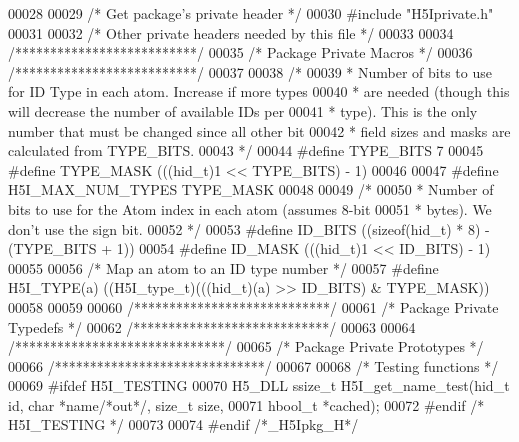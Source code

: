 \begin{DoxyCode}
00028 
00029 \textcolor{comment}{/* Get package's private header */}
00030 \textcolor{preprocessor}{#include "H5Iprivate.h"}
00031 
00032 \textcolor{comment}{/* Other private headers needed by this file */}
00033 
00034 \textcolor{comment}{/**************************/}
00035 \textcolor{comment}{/* Package Private Macros */}
00036 \textcolor{comment}{/**************************/}
00037 
00038 \textcolor{comment}{/*}
00039 \textcolor{comment}{ * Number of bits to use for ID Type in each atom. Increase if more types}
00040 \textcolor{comment}{ * are needed (though this will decrease the number of available IDs per}
00041 \textcolor{comment}{ * type). This is the only number that must be changed since all other bit}
00042 \textcolor{comment}{ * field sizes and masks are calculated from TYPE\_BITS.}
00043 \textcolor{comment}{ */}
00044 \textcolor{preprocessor}{#define TYPE\_BITS   7}
00045 \textcolor{preprocessor}{#define TYPE\_MASK   (((hid\_t)1 << TYPE\_BITS) - 1)}
00046 
00047 \textcolor{preprocessor}{#define H5I\_MAX\_NUM\_TYPES TYPE\_MASK}
00048 
00049 \textcolor{comment}{/*}
00050 \textcolor{comment}{ * Number of bits to use for the Atom index in each atom (assumes 8-bit}
00051 \textcolor{comment}{ * bytes). We don't use the sign bit.}
00052 \textcolor{comment}{ */}
00053 \textcolor{preprocessor}{#define ID\_BITS     ((sizeof(hid\_t) * 8) - (TYPE\_BITS + 1))}
00054 \textcolor{preprocessor}{#define ID\_MASK     (((hid\_t)1 << ID\_BITS) - 1)}
00055 
00056 \textcolor{comment}{/* Map an atom to an ID type number */}
00057 \textcolor{preprocessor}{#define H5I\_TYPE(a) ((H5I\_type\_t)(((hid\_t)(a) >> ID\_BITS) & TYPE\_MASK))}
00058 
00059 
00060 \textcolor{comment}{/****************************/}
00061 \textcolor{comment}{/* Package Private Typedefs */}
00062 \textcolor{comment}{/****************************/}
00063 
00064 \textcolor{comment}{/******************************/}
00065 \textcolor{comment}{/* Package Private Prototypes */}
00066 \textcolor{comment}{/******************************/}
00067 
00068 \textcolor{comment}{/* Testing functions */}
00069 \textcolor{preprocessor}{#ifdef H5I\_TESTING}
00070 H5\_DLL ssize\_t H5I\_get\_name\_test(hid\_t \textcolor{keywordtype}{id}, \textcolor{keywordtype}{char} *name\textcolor{comment}{/*out*/}, \textcolor{keywordtype}{size\_t} size,
00071     hbool\_t *cached);
00072 \textcolor{preprocessor}{#endif }\textcolor{comment}{/* H5I\_TESTING */}\textcolor{preprocessor}{}
00073 
00074 \textcolor{preprocessor}{#endif }\textcolor{comment}{/*\_H5Ipkg\_H*/}\textcolor{preprocessor}{}
\end{DoxyCode}
